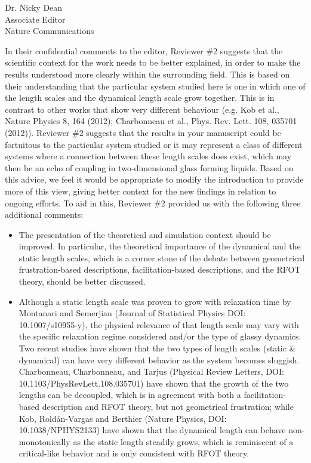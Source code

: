 \documentclass[a4paper, rebuttal, parskip=true, firsthead=false, fromemail=true, foldmarks=false]{scrlttr2}
\begin{document}
\begin{letter}{Dr. Nicky Dean\\
Associate Editor\\
Nature Communications}
\begin{quotationi}
In their confidential comments to the editor, Reviewer \#2 suggests that the scientific context for the work needs to be better explained, in order to make the results understood more clearly within the surrounding field. This is based on their understanding that the particular system studied here is one in which one of the length scales and the dynamical length scale grow together. This is in contrast to other works that show very different behaviour (e.g. Kob et al., Nature Physics 8, 164 (2012); Charbonneau et al., Phys. Rev. Lett. 108, 035701 (2012)). Reviewer \#2 suggests that the results in your manuscript could be fortuitous to the particular system studied or it may represent a class of different systems where a connection between these length scales does exist, which may then be an echo of coupling in two-dimensional glass forming liquids. Based on this advice, we feel it would be appropriate to modify the introduction to provide more of this view, giving better context for the new findings in relation to ongoing efforts. To aid in this, Reviewer \#2 provided us with the following three additional comments:
\begin{itemize}
\item The presentation of the theoretical and simulation context should be improved. In particular, the theoretical importance of the dynamical and the static length scales, which is a corner stone of the debate between geometrical frustration-based descriptions, facilitation-based descriptions, and the RFOT theory, should be better discussed.

\item Although a static length scale was proven to grow with relaxation time by Montanari and Semerjian (Journal of Statistical Physics DOI: \\ 10.1007/s10955\nobreakdash-y), the physical relevance of that length scale may vary with the specific relaxation regime considered and/or the type of glassy dynamics. Two recent studies have shown that the two types of length scales (static \& dynamical) can have very different behavior as the system becomes sluggish. Charbonneau, Charbonneau, and Tarjus (Physical Review Letters, DOI: 10.1103/PhysRevLett.108.035701) have shown that the growth of the two lengths can be decoupled, which is in agreement with both a facilitation-based description and RFOT theory, but not geometrical frustration; while Kob, Roldán-Vargas and Berthier (Nature Physics, DOI: 10.1038/NPHYS2133) have shown that the dynamical length can behave non-monotonically as the static length steadily grows, which is reminiscent of a critical-like behavior and is only consistent with
RFOT theory.
\end{itemize}
\end{quotationi}


\end{letter}
\end{document}
